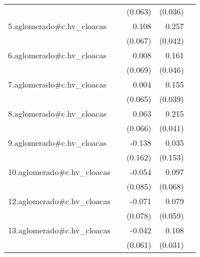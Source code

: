 {\begin{longtable}{l*{4}{D{.}{.}{-1}}}
            &                     &     (0.063)         &     (0.036)         &                     \\
\addlinespace
5.aglomerado#c.hv\_cloacas&                     &       0.108         &       0.257\sym{***}&                     \\
            &                     &     (0.067)         &     (0.042)         &                     \\
\addlinespace
6.aglomerado#c.hv\_cloacas&                     &       0.008         &       0.161\sym{***}&                     \\
            &                     &     (0.069)         &     (0.046)         &                     \\
\addlinespace
7.aglomerado#c.hv\_cloacas&                     &       0.004         &       0.155\sym{***}&                     \\
            &                     &     (0.065)         &     (0.039)         &                     \\
\addlinespace
8.aglomerado#c.hv\_cloacas&                     &       0.063         &       0.215\sym{***}&                     \\
            &                     &     (0.066)         &     (0.041)         &                     \\
\addlinespace
9.aglomerado#c.hv\_cloacas&                     &      -0.138         &       0.035         &                     \\
            &                     &     (0.162)         &     (0.153)         &                     \\
\addlinespace
10.aglomerado#c.hv\_cloacas&                     &      -0.054         &       0.097         &                     \\
            &                     &     (0.085)         &     (0.068)         &                     \\
\addlinespace
12.aglomerado#c.hv\_cloacas&                     &      -0.071         &       0.079         &                     \\
            &                     &     (0.078)         &     (0.059)         &                     \\
\addlinespace
13.aglomerado#c.hv\_cloacas&                     &      -0.042         &       0.108\sym{***}&                     \\
            &                     &     (0.061)         &     (0.031)         &                     \\

\end{longtable}}
